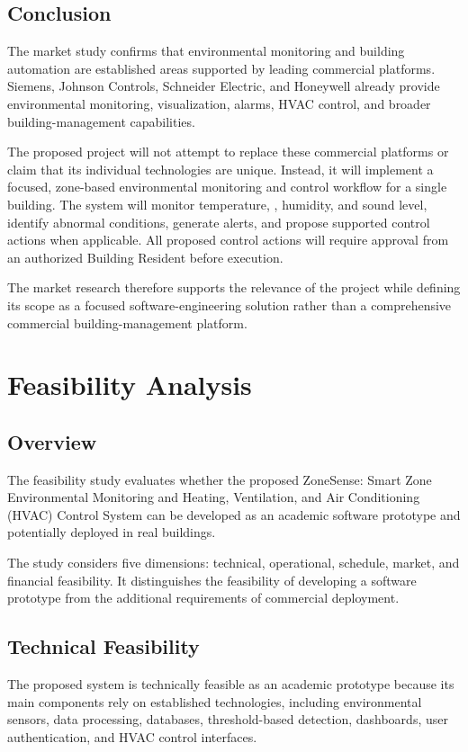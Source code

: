 \documentclass[11pt,a4paper]{article}
\begin{document}
\subsection{Conclusion}
The market study confirms that environmental monitoring and building automation are established areas supported by leading commercial platforms. Siemens, Johnson Controls, Schneider Electric, and Honeywell already provide environmental monitoring, visualization, alarms, HVAC control, and broader building-management capabilities.

The proposed project will not attempt to replace these commercial platforms or claim that its individual technologies are unique. Instead, it will implement a focused, zone-based environmental monitoring and control workflow for a single building. The system will monitor temperature, \COtwo, humidity, and sound level, identify abnormal conditions, generate alerts, and propose supported control actions when applicable. All proposed control actions will require approval from an authorized Building Resident before execution.

The market research therefore supports the relevance of the project while defining its scope as a focused software-engineering solution rather than a comprehensive commercial building-management platform.

\clearpage
\section{Feasibility Analysis}

\subsection{Overview}
The feasibility study evaluates whether the proposed ZoneSense: Smart Zone Environmental Monitoring and Heating, Ventilation, and Air Conditioning (HVAC) Control System can be developed as an academic software prototype and potentially deployed in real buildings.

The study considers five dimensions: technical, operational, schedule, market, and financial feasibility. It distinguishes the feasibility of developing a software prototype from the additional requirements of commercial deployment.

\subsection{Technical Feasibility}
The proposed system is technically feasible as an academic prototype because its main components rely on established technologies, including environmental sensors, data processing, databases, threshold-based detection, dashboards, user authentication, and HVAC control interfaces.
\end{document}
